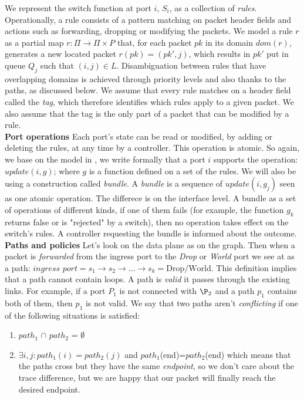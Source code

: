 \documentclass{article}
\begin{document}
We represent the switch function at port $i$, $S_i$, as a collection of \emph{rules}. Operationally, a rule consists of a pattern matching on packet header fields and actions such as forwarding, dropping or modifying the packets. We model a rule $r$ as a partial map $r:\Pi\rightarrow \Pi\times P$ that, for each packet $pk$ in its domain $\textit{dom}(r)$, generates a new located packet $r(pk)=(pk',j)$, which results in $pk'$ put in queue $Q_j$ such that $(i,j)\in L$. Disambiguation between rules that have overlapping domains is achieved through priority levels and also thanks to the paths, as discussed below. We assume that every rule matches on a header field called the \emph{tag}, which therefore identifies which rules apply to a given packet. We also assume that the tag is the only part of a packet that can be modified by a rule.\\
\textbf{Port operations} Each port's state can be read or modified, by adding or deleting the rules, at any time by a controller. This operation is atomic. So again, we base on the model in \cite{CKLS15}, we write formally that a port $i$ supports the operation: $update(i,g)$; where $g$ is a function defined on a set of the rules.
 We will also be using a construction called \emph{bundle}. A \emph{bundle} is a sequence of $update(i,g_j)$ seen as one atomic operation. The differece is on the interface level. A bundle as a set of operations of different kinds, if one of them fails (for example, the function $g_k$ returns false or is "rejected" by a switch), then no operation takes effect on the switch's rules. A controller requesting the bundle is informed about the outcome.\\
\textbf{Paths and policies}
Let's look on the data plane as on the graph. Then when a packet is \emph{forwarded} from the ingress port to the \emph{Drop} or \emph{World} port we see at as a path: $\textit{ingress port} = s_1\rightarrow s_2 \rightarrow\ldots\rightarrow s_k = \text{Drop/World.}$ This definition implies that a path cannot contain loops. A path is \emph{valid} it passes through the existing links. For example, if a port $P_1$ is not connected with $\P_2$ and a path $p_1$ contains both of them, then $p_1$ is not valid. 
We say that two paths aren't \emph{conflicting} if one of the following situations is satisfied:
    \begin{enumerate}
    \item \emph{$path_1$} $\cap$ \emph{$path_2$} = $\emptyset$
    \item $\exists i,j:path_1(i) = path_2(j) $ and $path_1$(end)=$path_2$(end) which means that the paths cross but they have the same \emph{endpoint}, so we don't care about the trace difference, but we are happy that our packet will finally reach the desired endpoint.
    \end{enumerate}
\end{document}

